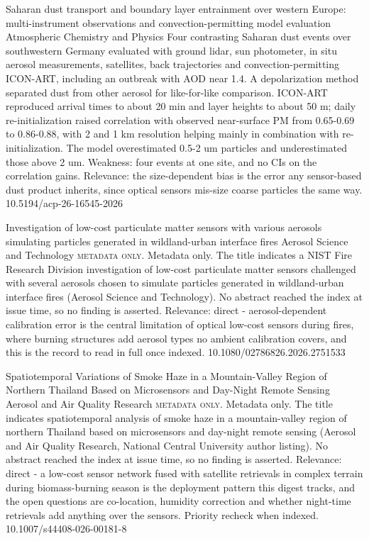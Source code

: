 \documentclass[10pt]{article}
\begin{document}
{Saharan dust transport and boundary layer entrainment over western Europe: multi-instrument observations and convection-permitting model evaluation}
{Atmospheric Chemistry and Physics}
{Four contrasting Saharan dust events over southwestern Germany evaluated with ground lidar, sun photometer, in situ aerosol measurements, satellites, back trajectories and convection-permitting ICON-ART, including an outbreak with AOD near 1.4. A depolarization method separated dust from other aerosol for like-for-like comparison. ICON-ART reproduced arrival times to about 20 min and layer heights to about 50 m; daily re-initialization raised correlation with observed near-surface PM from 0.65-0.69 to 0.86-0.88, with 2 and 1 km resolution helping mainly in combination with re-initialization. The model overestimated 0.5-2 um particles and underestimated those above 2 um. Weakness: four events at one site, and no CIs on the correlation gains. Relevance: the size-dependent bias is the error any sensor-based dust product inherits, since optical sensors mis-size coarse particles the same way.}
{10.5194/acp-26-16545-2026}

{Investigation of low-cost particulate matter sensors with various aerosols simulating particles generated in wildland-urban interface fires}
{Aerosol Science and Technology}
{\textsc{metadata only.} Metadata only. The title indicates a NIST Fire Research Division investigation of low-cost particulate matter sensors challenged with several aerosols chosen to simulate particles generated in wildland-urban interface fires (Aerosol Science and Technology). No abstract reached the index at issue time, so no finding is asserted. Relevance: direct - aerosol-dependent calibration error is the central limitation of optical low-cost sensors during fires, where burning structures add aerosol types no ambient calibration covers, and this is the record to read in full once indexed.}
{10.1080/02786826.2026.2751533}

{Spatiotemporal Variations of Smoke Haze in a Mountain-Valley Region of Northern Thailand Based on Microsensors and Day-Night Remote Sensing}
{Aerosol and Air Quality Research}
{\textsc{metadata only.} Metadata only. The title indicates spatiotemporal analysis of smoke haze in a mountain-valley region of northern Thailand based on microsensors and day-night remote sensing (Aerosol and Air Quality Research, National Central University author listing). No abstract reached the index at issue time, so no finding is asserted. Relevance: direct - a low-cost sensor network fused with satellite retrievals in complex terrain during biomass-burning season is the deployment pattern this digest tracks, and the open questions are co-location, humidity correction and whether night-time retrievals add anything over the sensors. Priority recheck when indexed.}
{10.1007/s44408-026-00181-8}
\end{document}
